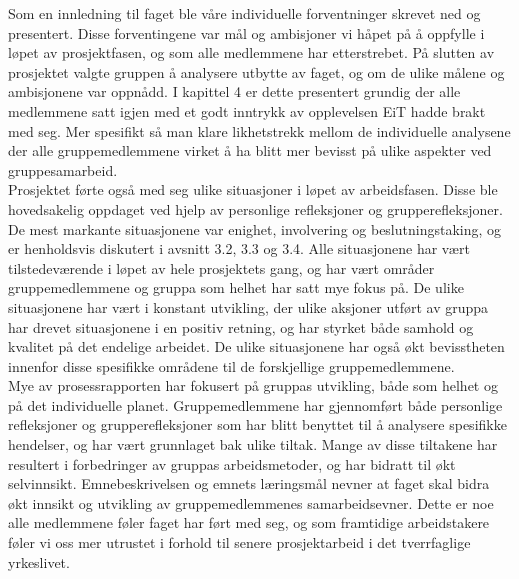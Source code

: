 
Som en innledning til faget ble våre individuelle forventninger skrevet ned og presentert. Disse forventingene var mål og ambisjoner vi håpet på å oppfylle i løpet av prosjektfasen, og som alle medlemmene har etterstrebet. På slutten av prosjektet valgte gruppen å analysere utbytte av faget, og om de ulike målene og ambisjonene var oppnådd. I kapittel 4 er dette presentert grundig der alle medlemmene satt igjen med et godt inntrykk av opplevelsen EiT hadde brakt med seg. Mer spesifikt så man klare likhetstrekk mellom de individuelle analysene der alle gruppemedlemmene virket å ha blitt mer bevisst på ulike aspekter ved gruppesamarbeid.\\

Prosjektet førte også med seg ulike situasjoner i løpet av arbeidsfasen. Disse ble hovedsakelig oppdaget ved hjelp av personlige refleksjoner og grupperefleksjoner. De mest markante situasjonene var enighet, involvering og beslutningstaking, og er henholdsvis diskutert i avsnitt 3.2, 3.3 og 3.4. Alle situasjonene har vært tilstedeværende i løpet av hele prosjektets gang, og har vært områder gruppemedlemmene og gruppa som helhet har satt mye fokus på. De ulike situasjonene har vært i konstant utvikling, der ulike aksjoner utført av gruppa har drevet situasjonene i en positiv retning, og har styrket både samhold og kvalitet på det endelige arbeidet. De ulike situasjonene har også økt bevisstheten innenfor disse spesifikke områdene til de forskjellige gruppemedlemmene.\\

Mye av prosessrapporten har fokusert på gruppas utvikling, både som helhet og på det individuelle planet. Gruppemedlemmene har gjennomført både personlige refleksjoner og grupperefleksjoner som har blitt benyttet til å analysere spesifikke hendelser, og har vært grunnlaget bak ulike tiltak. Mange av disse tiltakene har resultert i forbedringer av gruppas arbeidsmetoder, og har bidratt til økt selvinnsikt. Emnebeskrivelsen og emnets læringsmål nevner at faget skal bidra økt innsikt og utvikling av gruppemedlemmenes samarbeidsevner. Dette er noe alle medlemmene føler faget har ført med seg, og som framtidige arbeidstakere føler vi oss mer utrustet i forhold til senere prosjektarbeid i det tverrfaglige yrkeslivet.
